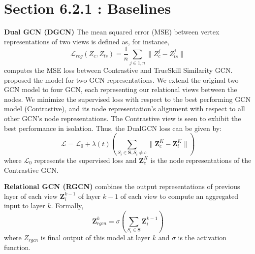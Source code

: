 \documentclass[smallcondensed]{svjour3}     %
\begin{document}
\section{Section 6.2.1 : Baselines }
\textbf{Dual GCN (DGCN)} The mean squared error (MSE) between vertex representations of two views is defined as, for instance,
\begin{equation*}
 \mathcal L_{reg}(Z_c, Z_{ts}) = \frac{1}{n} \sum_{j \in {1,n}}  \lVert Z_c^j - Z_{ts}^j \lVert
\end{equation*}
computes the MSE loss between Contrastive and TrueSkill Similarity GCN.
\cite{DualGCN} proposed the model for two GCN representations.
We extend the original two GCN model \cite{DualGCN} to four GCN, each representing our relational views between the nodes. We minimize the supervised loss with respect to the best performing GCN model (Contrastive), and its node representation's alignment with respect to all other GCN's node representations.
The Contrastive view is seen to exhibit the best performance in isolation. Thus, the DualGCN loss can be given by:
\begin{equation*}
  \mathcal L  = \mathcal L_0 +  \lambda{(t)} \left( \sum_{S_i \in \mathbf{S}, S_i \neq c} \lVert \mathbf{Z}_c^K - \mathbf{Z}_i^K \lVert \right)
\end{equation*}
where $\mathcal L_0$ represents the supervised loss and $\mathbf{Z}_c^K$ is the node representations of the Contrastive GCN.

\noindent
\textbf{Relational GCN (RGCN)} \cite{relationalGCN} combines the output representations of previous layer of each view $\mathbf{Z}_i^{k-1}$ of layer $k-1$ of each view to compute an aggregated input to layer $k$.
Formally,
\begin{equation*}
  \mathbf{Z}_{rgcn}^{k} = \sigma \left( \sum_{S_i \in \mathbf{S}} \mathbf{Z}_i^{k-1}\right)
\end{equation*}
where $Z_{rgcn}$ is final output of this model at layer $k$ and $\sigma$ is the activation function.
\end{document}
